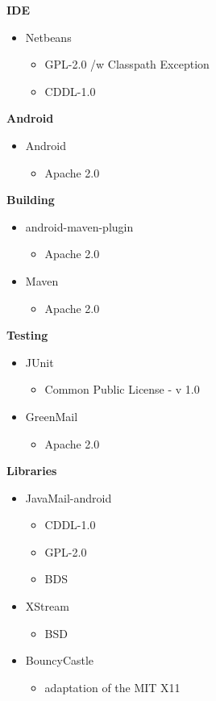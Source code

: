 	{\bf IDE}
		\begin{itemize}
			\item Netbeans\cite{bib:nli}
				\begin{itemize}
					\item GPL-2.0 /w Classpath Exception
					\item CDDL-1.0
				\end{itemize}
		\end{itemize}
	{\bf Android}
		\begin{itemize}
			\item Android\cite{bib:ali}
				\begin{itemize}
					\item Apache 2.0
				\end{itemize}
		\end{itemize}
	{\bf Building}
		\begin{itemize}
			\item android-maven-plugin\cite{bib:amli}
				\begin{itemize}
					\item Apache 2.0
				\end{itemize}
			\item Maven\cite{bib:mli}
				\begin{itemize}
					\item Apache 2.0
				\end{itemize}
		\end{itemize}
	{\bf Testing}
		\begin{itemize}
			\item JUnit\cite{bib:jli}
				\begin{itemize}
					\item Common Public License - v 1.0
				\end{itemize}
			\item GreenMail\cite{bib:gli}
				\begin{itemize}
					\item Apache 2.0
				\end{itemize}
		\end{itemize}
	{\bf Libraries}
		\begin{itemize}
			\item JavaMail-android\cite{bib:jmli}
				\begin{itemize}
					\item CDDL-1.0
					\item GPL-2.0
					\item BDS
				\end{itemize}
			\item XStream\cite{bib:xli}
				\begin{itemize}
					\item BSD
				\end{itemize}
			\item BouncyCastle\cite{bib:bcli}
				\begin{itemize}
					\item adaptation of the MIT X11
				\end{itemize}
		\end{itemize}

